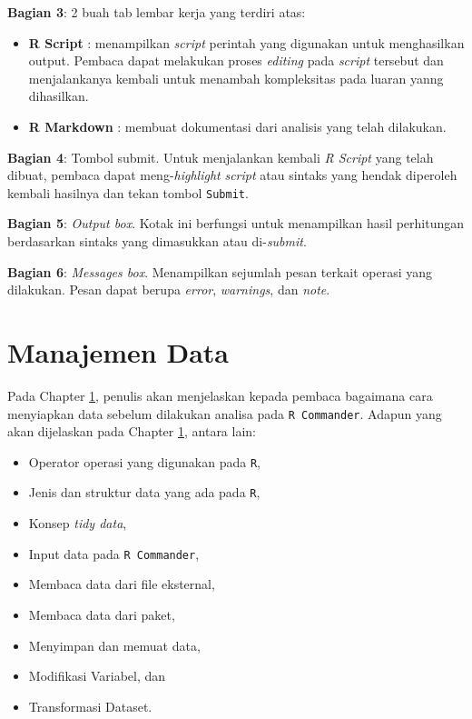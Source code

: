 \documentclass[12pt,]{krantz}
\providecommand{\tightlist}{%
  \setlength{\itemsep}{0pt}\setlength{\parskip}{0pt}}
\begin{document}
\textbf{Bagian 3}: 2 buah tab lembar kerja yang terdiri atas:

\begin{itemize}
\tightlist
\item
  \textbf{R Script} : menampilkan \emph{script} perintah yang digunakan untuk menghasilkan output. Pembaca dapat melakukan proses \emph{editing} pada \emph{script} tersebut dan menjalankanya kembali untuk menambah kompleksitas pada luaran yanng dihasilkan.
\item
  \textbf{R Markdown} : membuat dokumentasi dari analisis yang telah dilakukan.
\end{itemize}

\textbf{Bagian 4}: Tombol submit. Untuk menjalankan kembali \emph{R Script} yang telah dibuat, pembaca dapat meng-\emph{highlight} \emph{script} atau sintaks yang hendak diperoleh kembali hasilnya dan tekan tombol \texttt{Submit}.

\textbf{Bagian 5}: \emph{Output box}. Kotak ini berfungsi untuk menampilkan hasil perhitungan berdasarkan sintaks yang dimasukkan atau di-\emph{submit}.

\textbf{Bagian 6}: \emph{Messages box}. Menampilkan sejumlah pesan terkait operasi yang dilakukan. Pesan dapat berupa \emph{error}, \emph{warnings}, dan \emph{note}.

\hypertarget{datamanage}{%
\chapter{Manajemen Data}\label{datamanage}}

Pada Chapter \ref{datamanage}, penulis akan menjelaskan kepada pembaca bagaimana cara menyiapkan data sebelum dilakukan analisa pada \texttt{R\ Commander}. Adapun yang akan dijelaskan pada Chapter \ref{datamanage}, antara lain:

\begin{itemize}
\tightlist
\item
  Operator operasi yang digunakan pada \texttt{R},
\item
  Jenis dan struktur data yang ada pada \texttt{R},
\item
  Konsep \emph{tidy data},
\item
  Input data pada \texttt{R\ Commander},
\item
  Membaca data dari file eksternal,
\item
  Membaca data dari paket,
\item
  Menyimpan dan memuat data,
\item
  Modifikasi Variabel, dan
\item
  Transformasi Dataset.
\end{itemize}
\end{document}

